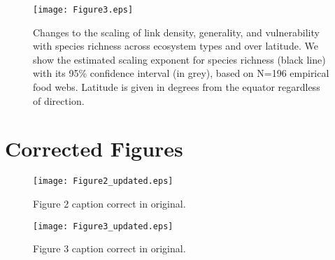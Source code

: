 \documentclass[12pt]{article}
\begin{document}
\begin{spacing}{2.0}
\begin{figure}[h]
\texttt{[image: Figure3.eps]}
\caption{Changes to the scaling of link density, generality, and vulnerability with species richness across ecosystem
types and over latitude. We show the estimated scaling exponent for species richness (black
line) with its 95\% confidence interval (in grey), based on N=196 empirical food webs.
Latitude is given in degrees from the equator regardless of direction.} 
\label{S1} 
\end{figure}

\clearpage

\section*{Corrected Figures}

\setcounter{figure}{1}
\begin{figure}[h]
\texttt{[image: Figure2\_updated.eps]}
\caption{
Figure 2 caption correct in original.}
\label{props_v_lat}
\end{figure}


\begin{figure}[h]
\texttt{[image: Figure3\_updated.eps]}
\caption{Figure 3 caption correct in original.} \label{S} \end{figure}


\end{spacing}
\end{document}

